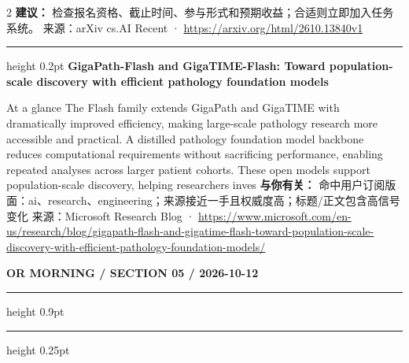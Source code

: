 \documentclass[10.5pt]{ctexart}
\begin{document}
\begin{multicols}{2}
\textbf{建议：} 检查报名资格、截止时间、参与形式和预期收益；合适则立即加入任务系统。
{\footnotesize\color{ormuted} 来源：arXiv cs.AI Recent · \url{https://arxiv.org/html/2610.13840v1}}
\vspace{2mm}
\hrule height 0.2pt
\vspace{2mm}
{\large\bfseries GigaPath-Flash and GigaTIME-Flash: Toward population-scale discovery with efficient pathology foundation models}\par
At a glance The Flash family extends GigaPath and GigaTIME with dramatically improved efficiency, making large-scale pathology research more accessible and practical. A distilled pathology foundation model backbone reduces computational requirements without sacrificing performance, enabling repeated analyses across larger patient cohorts. These open models support population-scale discovery, helping researchers inves
\textbf{与你有关：} 命中用户订阅版面：ai、research、engineering；来源接近一手且权威度高；标题/正文包含高信号变化
{\footnotesize\color{ormuted} 来源：Microsoft Research Blog · \url{https://www.microsoft.com/en-us/research/blog/gigapath-flash-and-gigatime-flash-toward-population-scale-discovery-with-efficient-pathology-foundation-models/}}
\end{multicols}
\newpage
{\small\bfseries OR MORNING / SECTION 05 / 2026-10-12}
\vspace{2mm}
\hrule height 0.9pt
\vspace{1.5mm}
\hrule height 0.25pt
\vspace{4mm}
\end{document}
